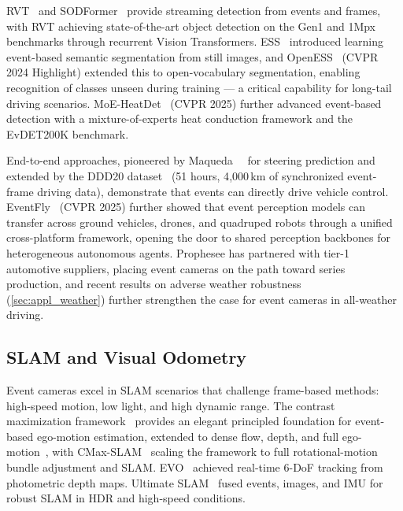 RVT~\cite{gehrig2023rvt} and SODFormer~\cite{zhao2023sodformer} provide streaming detection from events and frames, with RVT achieving state-of-the-art object detection on the Gen1 and 1Mpx benchmarks through recurrent Vision Transformers. ESS~\cite{sun2022ess} introduced learning event-based semantic segmentation from still images, and OpenESS~\cite{kong2024openess} (CVPR 2024 Highlight) extended this to open-vocabulary segmentation, enabling recognition of classes unseen during training --- a critical capability for long-tail driving scenarios. MoE-HeatDet~\cite{zhang2025mvheatdet} (CVPR 2025) further advanced event-based detection with a mixture-of-experts heat conduction framework and the EvDET200K benchmark.

End-to-end approaches, pioneered by Maqueda~\etal~\cite{maqueda2018steering} for steering prediction and extended by the DDD20 dataset~\cite{hu2020ddd20} (51 hours, 4{,}000\,km of synchronized event-frame driving data), demonstrate that events can directly drive vehicle control. EventFly~\cite{kong2025eventfly} (CVPR 2025) further showed that event perception models can transfer across ground vehicles, drones, and quadruped robots through a unified cross-platform framework, opening the door to shared perception backbones for heterogeneous autonomous agents. Prophesee has partnered with tier-1 automotive suppliers, placing event cameras on the path toward series production, and recent results on adverse weather robustness (\cref{sec:appl_weather}) further strengthen the case for event cameras in all-weather driving.


\subsection{SLAM and Visual Odometry}
\label{sec:appl_slam}

Event cameras excel in SLAM scenarios that challenge frame-based methods: high-speed motion, low light, and high dynamic range. The contrast maximization framework~\cite{gallego2018cmax} provides an elegant principled foundation for event-based ego-motion estimation, extended to dense flow, depth, and full ego-motion~\cite{shiba2024cmaxsecrets}, with CMax-SLAM~\cite{gallego2024cmaxslam} scaling the framework to full rotational-motion bundle adjustment and SLAM. EVO~\cite{rebecq2018evo} achieved real-time 6-DoF tracking from photometric depth maps. Ultimate SLAM~\cite{vidal2018ultimateslam} fused events, images, and IMU for robust SLAM in HDR and high-speed conditions.

